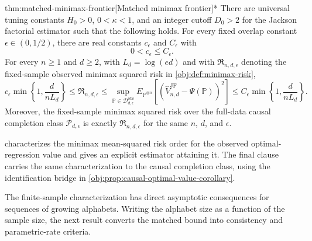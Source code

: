 \begin{theoremv}{thm:matched-minimax-frontier}[Matched minimax frontier]*
There are universal tuning constants \(H_0>0\), \(0<\kappa<1\), and an integer cutoff \(D_0>2\) for the Jackson factorial estimator such that the following holds.  For every fixed overlap constant \(\epsilon\in(0,1/2)\), there are real constants \(c_\epsilon\) and \(C_\epsilon\) with
\[
0<c_\epsilon\leq C_\epsilon .
\]
For every \(n\geq 1\) and \(d\geq 2\), with \(L_d=\log(ed)\) and with \(\mathfrak R_{n,d,\epsilon}\) denoting the fixed-sample observed minimax squared risk in \cref{obj:def:minimax-risk},
\[
c_\epsilon \min\left\{1,\frac{d}{nL_d}\right\}
\leq
\mathfrak R_{n,d,\epsilon}
\leq
\sup_{\mathbb P\in\mathcal D_{d,\epsilon}^{\mathrm{obs}}}
E_{\mathbb P^{\otimes n}}\!\left[
  \left(\widehat V_{n,d}^{\mathrm{JF}}-\Psi(\mathbb P)\right)^2
\right]
\leq
C_\epsilon \min\left\{1,\frac{d}{nL_d}\right\}.
\]
Moreover, the fixed-sample minimax squared risk over the full-data causal completion class \(\mathcal P_{d,\epsilon}\) is exactly \(\mathfrak R_{n,d,\epsilon}\) for the same \(n\), \(d\), and \(\epsilon\).
\end{theoremv}

 characterizes the minimax mean-squared risk order for the observed optimal-regression value and gives an explicit estimator attaining it. The final clause carries the same characterization to the causal completion class, using the identification bridge in \cref{obj:prop:causal-optimal-value-corollary}.

The finite-sample characterization has direct asymptotic consequences for sequences of growing alphabets. Writing the alphabet size as a function of the sample size, the next result converts the matched bound into consistency and parametric-rate criteria.

